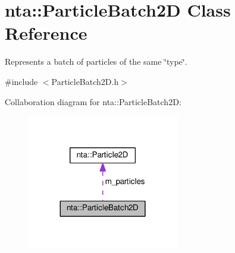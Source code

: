 \hypertarget{classnta_1_1ParticleBatch2D}{}\section{nta\+:\+:Particle\+Batch2D Class Reference}
\label{classnta_1_1ParticleBatch2D}


Represents a batch of particles of the same \char`\"{}type\char`\"{}.  




{\ttfamily \#include $<$Particle\+Batch2\+D.\+h$>$}



Collaboration diagram for nta\+:\+:Particle\+Batch2D\+:
\nopagebreak
\begin{figure}[H]
\begin{center}
\leavevmode
\includegraphics[width=188pt]{d4/d22/classnta_1_1ParticleBatch2D__coll__graph}
\end{center}
\end{figure}
